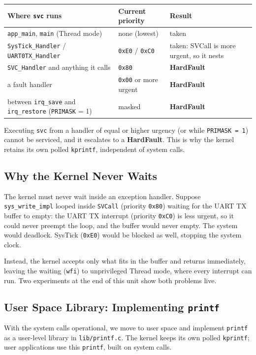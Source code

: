 \begin{table}[h!]
    \centering
    \small
    \begin{tabular}{p{5.2cm} p{2.8cm} p{4.5cm}}
        \toprule
        \textbf{Where \texttt{svc} runs} & \textbf{Current priority} & \textbf{Result} \\
        \midrule
        \texttt{app\_main}, \texttt{main} (Thread mode) & none (lowest) & taken \\
        \texttt{SysTick\_Handler} / \texttt{UART0TX\_Handler} & \texttt{0xE0} / \texttt{0xC0} &
        taken: SVCall is more urgent, so it nests \\
        \texttt{SVC\_Handler} and anything it calls & \texttt{0x80} & \textbf{HardFault} \\
        a fault handler & \texttt{0x00} or more urgent & \textbf{HardFault} \\
        between \texttt{irq\_save} and \texttt{irq\_restore} (\texttt{PRIMASK} = 1) &
        masked & \textbf{HardFault} \\
        \bottomrule
    \end{tabular}
\end{table}

Executing \texttt{svc} from a handler of equal or higher urgency (or while \texttt{PRIMASK = 1}) cannot be serviced, and it escalates to a \textbf{HardFault}. This is why the kernel retains its own polled \texttt{kprintf}, independent of system calls.

\subsection{Why the Kernel Never Waits}
The kernel must never wait inside an exception handler. Suppose \texttt{sys\_write\_impl} looped inside \texttt{SVCall} (priority \texttt{0x80}) waiting for the UART TX buffer to empty: the UART TX interrupt (priority \texttt{0xC0}) is less urgent, so it could never preempt the loop, and the buffer would never empty. The system would deadlock. SysTick (\texttt{0xE0}) would be blocked as well, stopping the system clock.

Instead, the kernel accepts only what fits in the buffer and returns immediately, leaving the waiting (\texttt{wfi}) to unprivileged Thread mode, where every interrupt can run. Two experiments at the end of this unit show both problems live.

\subsection{User Space Library: Implementing \texttt{printf}}
With the system calls operational, we move to user space and implement \texttt{printf} as a user-level library in \texttt{lib/printf.c}. The kernel keeps its own polled \texttt{kprintf}; user applications use this \texttt{printf}, built on system calls.

